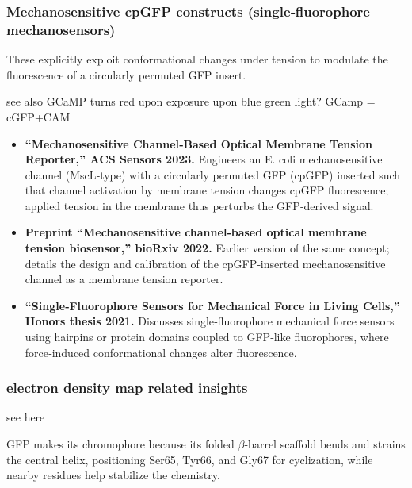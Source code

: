 \documentclass{article}
\begin{document}
\subsubsection*{Mechanosensitive cpGFP constructs (single‑fluorophore mechanosensors)}

These explicitly exploit conformational changes under tension to modulate the fluorescence of a circularly permuted GFP insert.

\begin{remark}
  
see also \href{https://pmc.ncbi.nlm.nih.gov/articles/PMC4575167/}{\textbullet} GCaMP turns red upon exposure upon blue green light? GCamp = cGFP+CAM
\end{remark}

  

\begin{itemize}
    \item \textbf{``Mechanosensitive Channel‑Based Optical Membrane Tension Reporter,'' ACS Sensors 2023.}
    Engineers an E. coli mechanosensitive channel (MscL‑type) with a circularly permuted GFP (cpGFP) inserted such that channel activation by membrane tension changes cpGFP fluorescence; applied tension in the membrane thus perturbs the GFP‑derived signal. \href{https://pubs.acs.org/doi/10.1021/acssensors.2c01921}{\textbullet}

    \item \textbf{Preprint ``Mechanosensitive channel‑based optical membrane tension biosensor,'' bioRxiv 2022.}
    Earlier version of the same concept; details the design and calibration of the cpGFP‑inserted mechanosensitive channel as a membrane tension reporter. \href{https://www.biorxiv.org/content/10.1101/2022.10.04.510821v1.full}{\textbullet}

    \item \textbf{``Single‑Fluorophore Sensors for Mechanical Force in Living Cells,'' Honors thesis 2021.}
    Discusses single‑fluorophore mechanical force sensors using hairpins or protein domains coupled to GFP‑like fluorophores, where force‑induced conformational changes alter fluorescence. \href{https://digitalcommons.lib.uconn.edu/cgi/viewcontent.cgi?article=1928\&context=srhonors\_theses}{\textbullet}
\end{itemize}

\subsubsection*{electron density map related insights}
see 
\href{https://www.pnas.org/doi/10.1073/pnas.2133463100#sec-1}{\textbullet} here
\begin{proposition}
GFP makes its chromophore because its folded $\beta $-barrel scaffold bends and strains the central helix, positioning Ser65, Tyr66, and Gly67 for cyclization, while nearby residues help stabilize the chemistry. 
\end{proposition}
\end{document}
